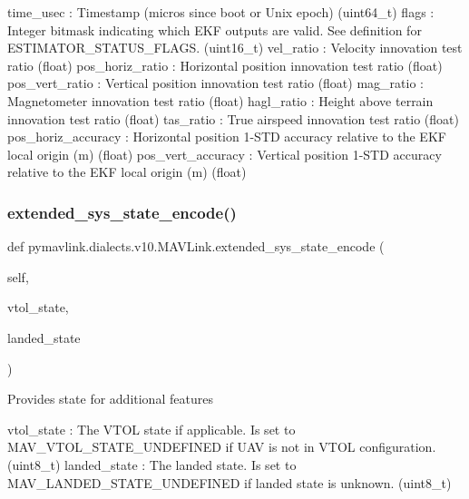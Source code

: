 \begin{DoxyVerb}
\begin{DoxyVerb}
\begin{DoxyVerb}
time_usec                 : Timestamp (micros since boot or Unix epoch) (uint64_t)
flags                     : Integer bitmask indicating which EKF outputs are valid. See definition for ESTIMATOR_STATUS_FLAGS. (uint16_t)
vel_ratio                 : Velocity innovation test ratio (float)
pos_horiz_ratio           : Horizontal position innovation test ratio (float)
pos_vert_ratio            : Vertical position innovation test ratio (float)
mag_ratio                 : Magnetometer innovation test ratio (float)
hagl_ratio                : Height above terrain innovation test ratio (float)
tas_ratio                 : True airspeed innovation test ratio (float)
pos_horiz_accuracy        : Horizontal position 1-STD accuracy relative to the EKF local origin (m) (float)
pos_vert_accuracy         : Vertical position 1-STD accuracy relative to the EKF local origin (m) (float)\end{DoxyVerb}
 \mbox{\label{classpymavlink_1_1dialects_1_1v10_1_1MAVLink_aceee34ad22cb568de2024ca9598b20b0}} 
\subsubsection{\texorpdfstring{extended\+\_\+sys\+\_\+state\+\_\+encode()}{extended\_sys\_state\_encode()}}
{\footnotesize\ttfamily def pymavlink.\+dialects.\+v10.\+M\+A\+V\+Link.\+extended\+\_\+sys\+\_\+state\+\_\+encode (\begin{DoxyParamCaption}\item[{}]{self,  }\item[{}]{vtol\+\_\+state,  }\item[{}]{landed\+\_\+state }\end{DoxyParamCaption})}

\begin{DoxyVerb}Provides state for additional features

vtol_state                : The VTOL state if applicable. Is set to MAV_VTOL_STATE_UNDEFINED if UAV is not in VTOL configuration. (uint8_t)
landed_state              : The landed state. Is set to MAV_LANDED_STATE_UNDEFINED if landed state is unknown. (uint8_t)\end{DoxyVerb}
 \mbox{\label{classpymavlink_1_1dialects_1_1v10_1_1MAVLink_a1bb0352c0c10ae0a6be8b40a99921a2c}} 

\end{DoxyVerb}
\end{DoxyVerb}
